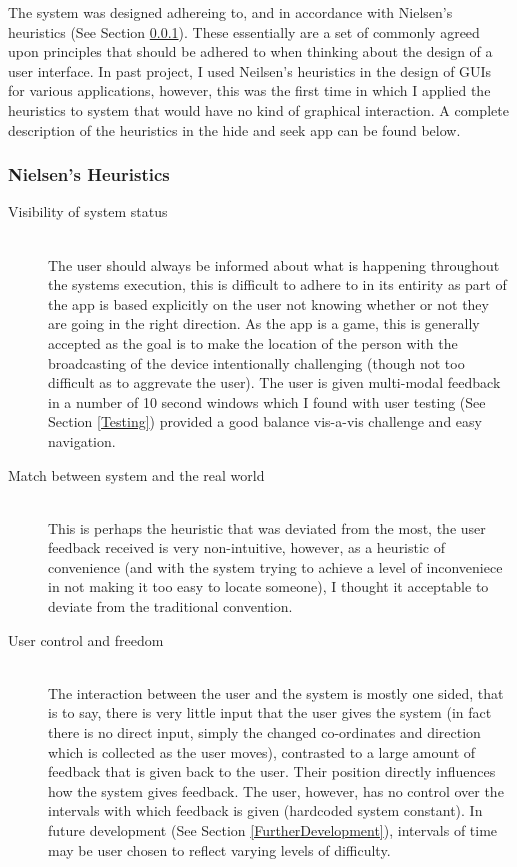 \documentclass[12pt]{article} %
\begin{document}
The system was designed adhereing to, and in accordance with Nielsen's heuristics (See Section
\ref{Neilsen}). These essentially are a set of commonly agreed upon principles that should be
adhered to when thinking about the design of a user interface. In past project, I used Neilsen's
heuristics in the design of GUIs for various applications, however, this was the first time in
which I applied the heuristics to system that would have no kind of graphical interaction. A
complete description of the heuristics in the hide and seek app can be found below.

\subsubsection{Nielsen's Heuristics}
\label{Neilsen}
\begin{description}
\item[Visibility of system status] \hfill \\
The user should always be informed about what is happening throughout the systems execution, this
is difficult to adhere to in its entirity as part of the app is based explicitly on the user not
knowing whether or not they are going in the right direction. As the app is a game, this is
generally accepted as the goal is to make the location of the person with the broadcasting of the
device intentionally challenging (though not too difficult as to aggrevate the user). The user is
given multi-modal feedback in a number of 10 second windows which I found with user testing (See
Section \ref{Testing}) provided a good balance vis-a-vis challenge and easy navigation.


\item[Match between system and the real world] \hfill \\
This is perhaps the heuristic that was deviated from the most, the user feedback received is very
non-intuitive, however, as a heuristic of convenience (and with the system trying to achieve a level
of inconveniece in not making it too easy to locate someone), I thought it acceptable to deviate
from the traditional convention.

\item[User control and freedom] \hfill \\
The interaction between the user and the system is mostly one sided, that is to say, there is very
little input that the user gives the system (in fact there is no direct input, simply the changed
co-ordinates and direction which is collected as the user moves), contrasted to a large amount of
feedback that is given back to the user. Their position directly influences how the system gives
feedback. The user, however, has no control over the intervals with which feedback is given
(hardcoded system constant). In future development (See Section \ref{FurtherDevelopment}),
intervals of time may be user chosen to reflect varying levels of difficulty.


\end{description}
\end{document}
